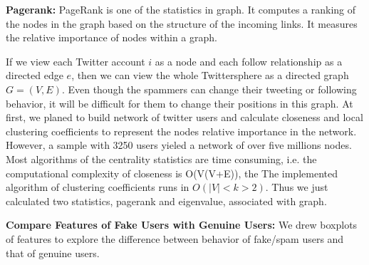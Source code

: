 \documentclass[a4paper, 12pt]{report}
\begin{document}
\noindent\textbf{Pagerank:} PageRank is one of the statistics in graph. It computes a ranking of the nodes in the graph based on the structure of the incoming links. It measures the relative importance of nodes within a graph. \par 
\noindent If we view each Twitter account $i$ as a node and each follow relationship as a directed edge $e$, then we can view the whole Twittersphere as a directed graph $G = (V, E)$. Even though the spammers can change their tweeting or following behavior, it will be difficult for them to change their positions in this graph. At first, we planed to build network of twitter users and calculate closeness and local clustering coefficients to represent the nodes relative importance in the network. However, a sample with 3250 users yieled a network of over five millions nodes. Most algorithms of the centrality statistics are time consuming, i.e. the computational complexity of closeness is O(V(V+E)), the The implemented algorithm of clustering coefficients runs in $O(|V|<k>2)$. Thus we just calculated two statistics, pagerank and eigenvalue, associated with graph. \par

\noindent\textbf{Compare Features of Fake Users with Genuine Users:} We drew boxplots of features to explore the difference between behavior of fake/spam users and that of genuine users. 
\end{document}
